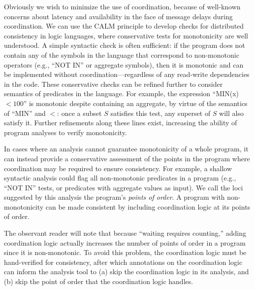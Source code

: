 Obviously we wish to minimize the use of coordination, because of well-known concerns about latency and availability in the face of message delays during coordination.  We can use the CALM principle to develop checks for distributed consistency in logic languages, where conservative tests for monotonicity are well understood. A simple syntactic check is often sufficient: if the program does not contain any of the symbols in the language that correspond to non-monotonic operators (e.g., ``NOT IN'' or aggregate symbols), then it is monotonic and can be implemented without coordination---regardless of any read-write dependencies in the code.  These conservative checks can be refined further to consider semantics of predicates in the language. For example, the expression ``MIN(x) $< 100$'' is monotonic despite containing an aggregate, by virtue of the semantics of ``MIN'' and $<$: once a subset $S$ satisfies this test, any superset of $S$ will also satisfy it.  Further refinements along these lines exist, increasing the ability of program analyses to verify monotonicity.
% 

In cases where an analysis cannot guarantee monotonicity of a whole program, it can instead provide a conservative assessment of the points in the program where coordination may be required to ensure consistency.  For example, a shallow syntactic analysis could flag all non-monotonic predicates in a program (e.g., ``NOT IN'' tests, or predicates with aggregate values as input).
We call the loci suggested by this analysis the program's \emph{points of
order}. A program with non-monotonicity can be made consistent by including coordination logic at its points of order.  

The observant reader will note that because ``waiting requires counting,'' adding coordination logic actually increases the number of points of order in a program since it is non-monotonic.  To avoid this problem, the coordination logic must be hand-verified for consistency, after which annotations on the coordination logic can inform the analysis tool to (a) skip the coordination logic in its analysis, and (b) skip the point of order that the coordination logic handles.  

